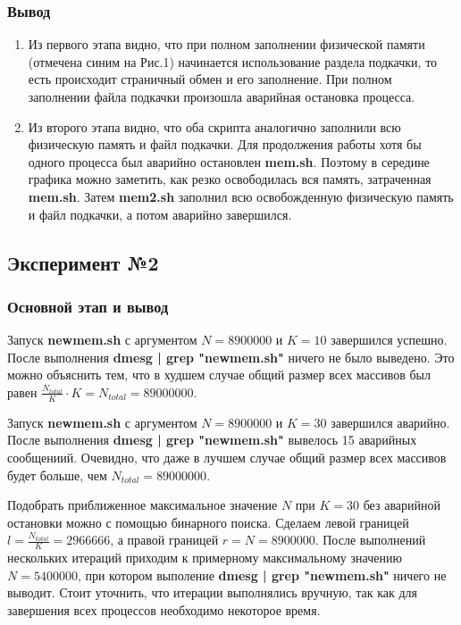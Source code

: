 \documentclass{article}
\begin{document}
\subsubsection*{Вывод}
\begin{enumerate}
    \item Из первого этапа видно, что при полном заполнении физической памяти (отмечена синим на Рис.1) начинается использование раздела подкачки, то есть происходит страничный обмен и его заполнение. При полном заполнении файла подкачки произошла аварийная остановка процесса. 
    \item Из второго этапа видно, что оба скрипта аналогично заполнили всю физическую память и файл подкачки. Для продолжения работы хотя бы одного процесса был аварийно остановлен \textbf{mem.sh}. Поэтому в середине графика можно заметить, как резко освободилась вся память, затраченная \textbf{mem.sh}. Затем \textbf{mem2.sh} заполнил всю освобожденную физическую память и файл подкачки, а потом аварийно завершился. 
\end{enumerate}


\bigskip

\subsection*{Эксперимент №2}

\subsubsection*{Основной этап и вывод}
Запуск \textbf{newmem.sh} с аргументом $N = 8900000$ и $K = 10$ завершился успешно. После выполнения \textbf{dmesg | grep "newmem.sh"} ничего не было выведено. Это можно объяснить тем, что в худшем случае общий размер всех массивов был равен $\frac{N_{total}}{K} \cdot K = N_{total} = 89000000$. 

\medskip

\noindent Запуск \textbf{newmem.sh} с аргументом $N = 8900000$ и $K = 30$ завершился аварийно. После выполнения \textbf{dmesg | grep "newmem.sh"} вывелось 15 аварийных сообщениий. Очевидно, что даже в лучшем случае общий размер всех массивов будет больше, чем $N_{total} = 89000000$.

\medskip

\noindent Подобрать приближенное максимальное значение $N$ при $K = 30$ без аварийной остановки можно с помощью бинарного поиска. Сделаем левой границей $l = \frac{N_{total}}{K} = 2966666$, а правой границей $r = N = 8900000$. После выполнений нескольких итераций приходим к примерному максимальному значению $N = 5400000$, при котором выполение \textbf{dmesg | grep "newmem.sh"} ничего не выводит. Стоит уточнить, что итерации выполнялись вручную, так как для завершения всех процессов необходимо некоторое время.
\end{document}
